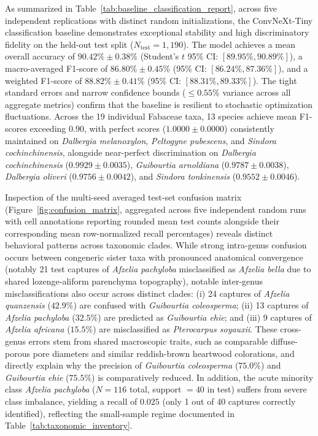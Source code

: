 \documentclass[a4paper,fleqn,12pt]{cas-sc}
\begin{document}
As summarized in Table~\ref{tab:baseline_classification_report}, across five independent replications with distinct random initializations, the ConvNeXt-Tiny classification baseline demonstrates exceptional stability and high discriminatory fidelity on the held-out test split ($N_{\text{test}} = 1,190$). The model achieves a mean overall accuracy of $90.42\% \pm 0.38\%$ (Student's $t$ 95\% CI: $[89.95\%, 90.89\%]$), a macro-averaged F1-score of $86.80\% \pm 0.45\%$ (95\% CI: $[86.24\%, 87.36\%]$), and a weighted F1-score of $88.82\% \pm 0.41\%$ (95\% CI: $[88.31\%, 89.33\%]$). The tight standard errors and narrow confidence bounds ($\le 0.55\%$ variance across all aggregate metrics) confirm that the baseline is resilient to stochastic optimization fluctuations. Across the 19 individual Fabaceae taxa, 13 species achieve mean F1-scores exceeding $0.90$, with perfect scores ($1.0000 \pm 0.0000$) consistently maintained on \textit{Dalbergia melanoxylon}, \textit{Peltogyne pubescens}, and \textit{Sindora cochinchinensis}, alongside near-perfect discrimination on \textit{Dalbergia cochinchinensis} ($0.9929 \pm 0.0035$), \textit{Guibourtia arnoldiana} ($0.9787 \pm 0.0038$), \textit{Dalbergia oliveri} ($0.9756 \pm 0.0042$), and \textit{Sindora tonkinensis} ($0.9552 \pm 0.0046$).

Inspection of the multi-seed averaged test-set confusion matrix (Figure~\ref{fig:confusion_matrix}, aggregated across five independent random runs with cell annotations reporting rounded mean test counts alongside their corresponding mean row-normalized recall percentages) reveals distinct behavioral patterns across taxonomic clades. While strong intra-genus confusion occurs between congeneric sister taxa with pronounced anatomical convergence (notably 21 test captures of \textit{Afzelia pachyloba} misclassified as \textit{Afzelia bella} due to shared lozenge-aliform parenchyma topography), notable inter-genus misclassifications also occur across distinct clades: (i) 24 captures of \textit{Afzelia quanzensis} ($42.9\%$) are confused with \textit{Guibourtia coleosperma}; (ii) 13 captures of \textit{Afzelia pachyloba} ($32.5\%$) are predicted as \textit{Guibourtia ehie}; and (iii) 9 captures of \textit{Afzelia africana} ($15.5\%$) are misclassified as \textit{Pterocarpus soyauxii}. These cross-genus errors stem from shared macroscopic traits, such as comparable diffuse-porous pore diameters and similar reddish-brown heartwood colorations, and directly explain why the precision of \textit{Guibourtia coleosperma} ($75.0\%$) and \textit{Guibourtia ehie} ($75.5\%$) is comparatively reduced. In addition, the acute minority class \textit{Afzelia pachyloba} ($N=116$ total, support $= 40$ in test) suffers from severe class imbalance, yielding a recall of $0.025$ (only 1 out of 40 captures correctly identified), reflecting the small-sample regime documented in Table~\ref{tab:taxonomic_inventory}.
\end{document}
